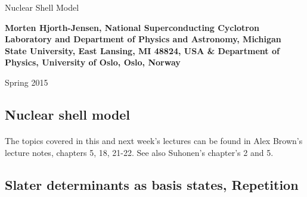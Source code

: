 \documentclass[%
twoside,                 %
final,                   %
10pt]{article}
\begin{document}




\thispagestyle{empty}

\begin{center}
{\LARGE\bf
\begin{spacing}{1.25}
Nuclear Shell Model
\end{spacing}
}
\end{center}


\begin{center}
{\bf Morten Hjorth-Jensen, National Superconducting Cyclotron Laboratory and Department of Physics and Astronomy, Michigan State University, East Lansing, MI 48824, USA {\&} Department of Physics, University of Oslo, Oslo, Norway${}^{}$} \\ [0mm]
\end{center}

    \begin{center}
\end{center}
    

\begin{center} %
Spring 2015
\end{center}

\vspace{1cm}


\subsection*{Nuclear shell model}

\paragraph{}

The topics covered in this and next week's lectures can be found in Alex Brown's lecture notes, chapters 5, 18, 21-22.
See also Suhonen's chapter's 2 and 5.



\subsection*{Slater determinants as basis states, Repetition}
\end{document}
